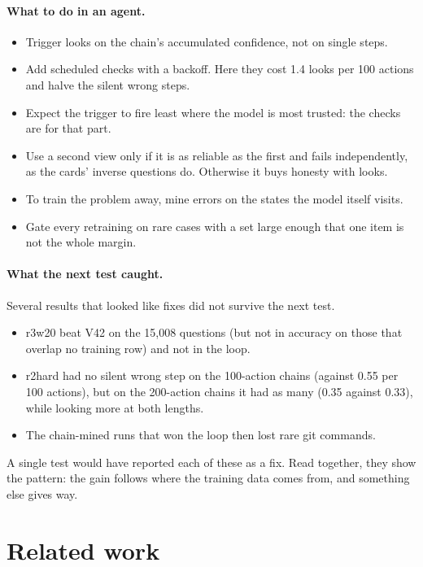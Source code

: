 \documentclass[11pt]{article}
\begin{document}
\paragraph{What to do in an agent.}
\begin{itemize}
  \item Trigger looks on the chain's accumulated confidence, not on single steps.
  \item Add scheduled checks with a backoff. Here they cost 1.4 looks per 100 actions and halve the silent wrong steps.
  \item Expect the trigger to fire least where the model is most trusted: the checks are for that part.
  \item Use a second view only if it is as reliable as the first and fails independently, as the cards' inverse
  questions do. Otherwise it buys honesty with looks.
  \item To train the problem away, mine errors on the states the model itself visits.
  \item Gate every retraining on rare cases with a set large enough that one item is not the whole margin.
\end{itemize}

\paragraph{What the next test caught.} Several results that looked like fixes did not survive the next test.
\begin{itemize}
  \item r3w20 beat V42 on the 15,008 questions (but not in accuracy on those that overlap no training row) and not in
  the loop.
  \item r2hard had no silent wrong step on the 100-action chains (against 0.55 per 100 actions), but on the 200-action
  chains it had as many (0.35 against 0.33), while looking more at both lengths.
  \item The chain-mined runs that won the loop then lost rare git commands.
\end{itemize}
A single test would have reported each of these as a fix. Read together, they show the pattern: the gain follows where
the training data comes from, and something else gives way.

\section{Related work}\label{sec:related}
\end{document}
